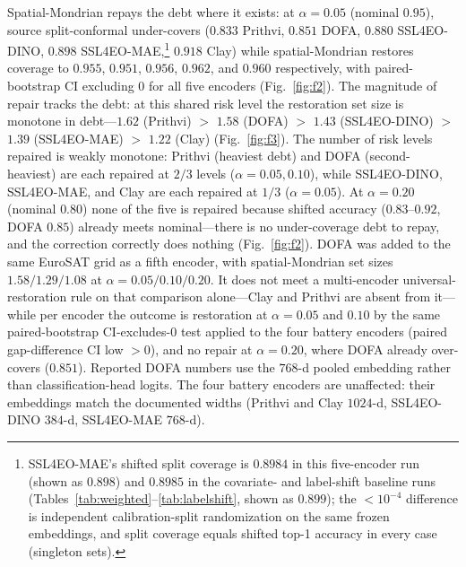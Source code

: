 \documentclass[journal]{IEEEtran}
\renewcommand{\_}{\textunderscore\allowbreak}
\begin{document}
Spatial-Mondrian repays the debt where it exists: at $\alpha=0.05$ (nominal $0.95$), source
split-conformal under-covers ($0.833$ Prithvi, $0.851$ DOFA, $0.880$ SSL4EO-DINO, $0.898$ SSL4EO-MAE,\footnote{%
SSL4EO-MAE's shifted split coverage is $0.8984$ in this five-encoder run (shown as $0.898$) and $0.8985$ in the
covariate- and label-shift baseline runs (Tables~\ref{tab:weighted}--\ref{tab:labelshift}, shown as $0.899$);
the ${<}10^{-4}$ difference is independent calibration-split randomization on the same frozen embeddings, and split coverage
equals shifted top-1 accuracy in every case (singleton sets).} $0.918$ Clay)
while spatial-Mondrian restores coverage to $0.955$, $0.951$, $0.956$, $0.962$, and $0.960$ respectively,
with paired-bootstrap CI excluding $0$ for all five encoders (Fig.~\ref{fig:f2}). The magnitude of repair tracks the debt:
at this shared risk level the restoration set size is monotone in debt---$1.62$ (Prithvi) $>$ $1.58$ (DOFA) $>$ $1.43$
(SSL4EO-DINO) $>$ $1.39$ (SSL4EO-MAE) $>$ $1.22$ (Clay) (Fig.~\ref{fig:f3}).
The number of risk levels repaired is weakly monotone: Prithvi (heaviest debt) and DOFA (second-heaviest) are each repaired at $2/3$
levels ($\alpha=0.05,0.10$), while SSL4EO-DINO, SSL4EO-MAE, and Clay are each repaired at $1/3$ ($\alpha=0.05$). At
$\alpha=0.20$ (nominal $0.80$) none of the five is repaired because shifted accuracy ($0.83$--$0.92$, DOFA $0.85$) already meets
nominal---there is no under-coverage debt to repay, and the correction correctly does nothing
(Fig.~\ref{fig:f2}). DOFA was added to the same EuroSAT grid as a fifth encoder, with spatial-Mondrian set sizes
$1.58/1.29/1.08$ at $\alpha=0.05/0.10/0.20$. It does not meet a multi-encoder universal-restoration
rule on that comparison alone---Clay and Prithvi are absent from it---while per encoder the outcome is
restoration at $\alpha=0.05$ and $0.10$ by the same paired-bootstrap CI-excludes-$0$ test applied to
the four battery encoders (paired gap-difference CI low $>0$), and no repair at $\alpha=0.20$, where DOFA already
over-covers ($0.851$). Reported DOFA numbers use the $768$-d pooled embedding rather than
classification-head logits. The four battery encoders are
unaffected: their embeddings match the documented widths (Prithvi and Clay
$1024$-d, SSL4EO-DINO $384$-d, SSL4EO-MAE $768$-d).
\end{document}

